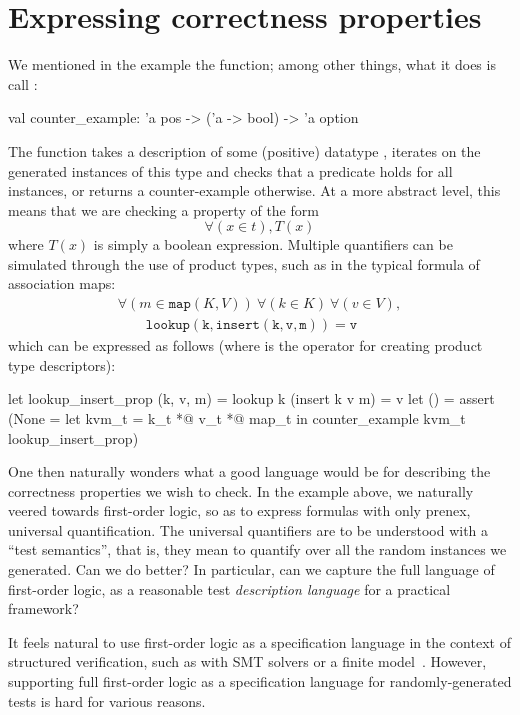 \section{Expressing correctness properties}

We mentioned in the  example the  function; among other
things, what it does is call :
%
\begin{ocamlcode}
val counter_example: 'a pos -> ('a -> bool) -> 'a option
\end{ocamlcode}
%
The function takes a description of some (positive) datatype
, iterates on the generated instances of this type and checks
that a predicate  holds for all instances, or returns
a counter-example otherwise. At a more abstract level, this means that we are
checking a property of the form \[ \forall (x \in t), T(x) \] where
$T(x)$ is simply a boolean expression.
Multiple quantifiers can be simulated through the use of product types, such as
in the typical formula of association maps:
%
\[\begin{array}{l}
  \forall (m \in \mathtt{map}(K,V))\ \forall (k \in K)\ \forall (v \in V),\\
  \qquad \mathtt{lookup(k,insert(k,v,m)) = v}
\end{array}\]
%
which can be expressed as follows (where  is the operator for creating
product type descriptors):
%
\begin{ocamlcode}
  let lookup_insert_prop (k, v, m) =
    lookup k (insert k v m) = v
  let () = assert (None =
    let kvm_t = k_t *@ v_t *@ map_t in
    counter_example kvm_t lookup_insert_prop)
\end{ocamlcode}

One then naturally wonders what a good language would be for describing the
correctness properties we wish to check. In the example above, we naturally
veered towards first-order logic, so as to express formulas with only prenex,
universal quantification. The universal quantifiers are to be understood with a
``test semantics'', that is, they mean to quantify over all the random instances
we generated.
%
Can we do better? In particular, can we capture the full language of first-order
logic, as a reasonable test \emph{description language} for a practical
framework?

It feels natural to use first-order logic as a specification language in the
context of structured verification, such as with SMT solvers or a finite
model~\cite{nitpick}.
However, supporting full first-order logic as a specification language for
randomly-generated tests is hard for various reasons. 

